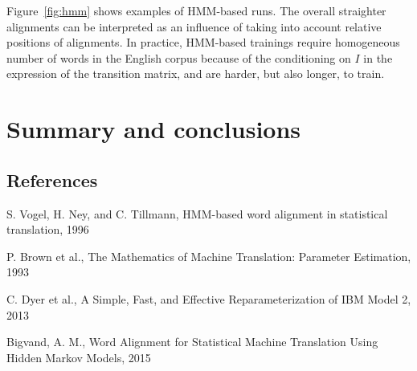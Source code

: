 \documentclass[final]{beamer}
\begin{document}
\begin{frame}[t]
\begin{multicols}{3}
Figure~\ref{fig:hmm} shows examples of HMM-based runs. The overall straighter alignments can be interpreted as an influence of taking into account relative positions of alignments. In practice, HMM-based trainings require homogeneous number of words in the English corpus because of the conditioning on $I$ in the expression of the transition matrix, and are harder, but also longer, to train. 

\section{Summary and conclusions}






\subsection{References}

\begin{thebibliography}{99}

 S. Vogel, H. Ney, and C. Tillmann, HMM-based word alignment in statistical translation, 1996

 P. Brown et al., The Mathematics of Machine Translation: Parameter Estimation, 1993

 C. Dyer et al., A Simple, Fast, and Effective Reparameterization of IBM Model 2, 2013

 Bigvand, A. M., Word Alignment for Statistical Machine Translation Using Hidden Markov Models, 2015

\end{thebibliography}

\end{multicols}

\end{frame}
\end{document}
